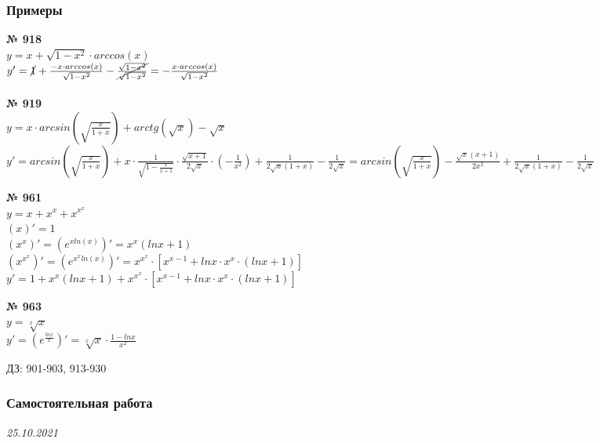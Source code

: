 \documentclass[12pt]{article}
\begin{document}
{\subsubsection{Примеры}

\vspace{.5cm}
{
	{\textbf{№ 918} \vspace{.5cm}\\}
	\large{ $y = x + \sqrt{1-x^2} \cdot arccos(x)$\\
		$y'=\cancel{1} + \frac{-x \cdot arccos(x)}{\sqrt{1-x^2}} - \cancel{\frac{\sqrt{1-x^2}}{\sqrt{1-x^2}}} = -\frac{x \cdot arccos(x)}{\sqrt{1-x^2}}
		$\\
	}
}
\vspace{.5cm}\\
{
	{\textbf{№ 919} \vspace{.5cm}\\}
	\large{ $y = x \cdot arcsin(\sqrt{\frac{x}{1+x}}) + arctg(\sqrt{x})-\sqrt{x}$\\
		$y'=arcsin(\sqrt{\frac{x}{1+x}}) + x\cdot \frac{1}{\sqrt{1-\frac{x}{x+1}}} \cdot \frac{\sqrt{x+1}}{2\sqrt{x}} \cdot (-\frac{1}{x^2}) + \frac{1}{2\sqrt{x}(1+x)}-\frac{1}{2\sqrt{x}} = arcsin(\sqrt{\frac{x}{1+x}}) - \frac{\sqrt{x}(x+1)}{2x^2}+\frac{1}{2\sqrt{x}(1+x)}-\frac{1}{2\sqrt{x}}$
	}
}

\vspace{.5cm}
{
	{\textbf{№ 961} \vspace{.5cm}\\}
	\large{ $y=x+x^x+x^{x^x}$\\
		$(x)'=1$\\
		$(x^x)'=(e^{xln(x)})'=x^x(lnx+1)$\\
		$(x^{x^x})'=(e^{x^xln(x)})'=x^{x^x}\cdot[x^{x-1}+lnx\cdot x^x \cdot (lnx+1)]$\\
		$y'=1+x^x(lnx+1)+x^{x^x}\cdot[x^{x-1}+lnx\cdot x^x \cdot (lnx+1)]$
	}
}

\vspace{.5cm}
{
	{\textbf{№ 963} \vspace{.5cm}\\}
	\large{ $y=\sqrt[x]{x}$\\
		$y'=(e^{\frac{lnx}{x}})'=\sqrt[x]{x} \cdot \frac{1-lnx}{x^2}$
	}
}


\vspace{2cm}
ДЗ: 901-903, 913-930

\vspace{2cm}

\subsubsection{Самостоятельная работа}
{\hfill \textit{25.10.2021}\\}

}
\end{document}

